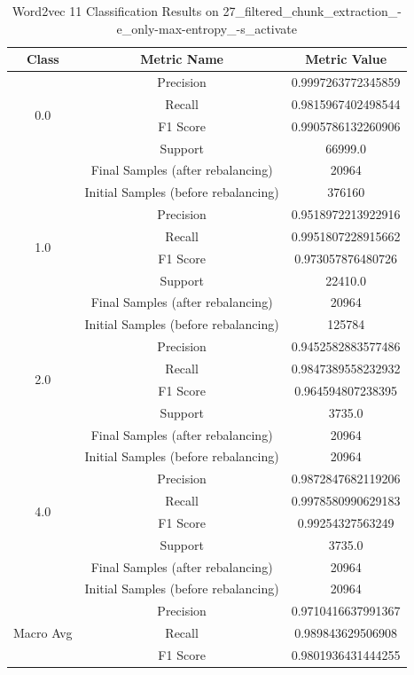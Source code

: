 \begin{longtable}{|c|c|c|}
\caption{Word2vec 11 Classification Results on 27\_filtered\_chunk\_extraction\_-e\_only-max-entropy\_-s\_activate} \label{tab:27_filtered_chunk_extraction_-e_only-max-entropy_-s_activate_word2vec_11_classifiers_results} \\
\hline
Class & Metric Name & Metric Value \\
\hline
\multirow{4}{*}{0.0} & Precision & 0.9997263772345859 \\
 & Recall & 0.9815967402498544 \\
 & F1 Score & 0.9905786132260906 \\
 & Support & 66999.0 \\
 & Final Samples (after rebalancing) & 20964 \\
 & Initial Samples (before rebalancing) & 376160 \\
\hline
\multirow{4}{*}{1.0} & Precision & 0.9518972213922916 \\
 & Recall & 0.9951807228915662 \\
 & F1 Score & 0.973057876480726 \\
 & Support & 22410.0 \\
 & Final Samples (after rebalancing) & 20964 \\
 & Initial Samples (before rebalancing) & 125784 \\
\hline
\multirow{4}{*}{2.0} & Precision & 0.9452582883577486 \\
 & Recall & 0.9847389558232932 \\
 & F1 Score & 0.964594807238395 \\
 & Support & 3735.0 \\
 & Final Samples (after rebalancing) & 20964 \\
 & Initial Samples (before rebalancing) & 20964 \\
\hline
\multirow{4}{*}{4.0} & Precision & 0.9872847682119206 \\
 & Recall & 0.9978580990629183 \\
 & F1 Score & 0.99254327563249 \\
 & Support & 3735.0 \\
 & Final Samples (after rebalancing) & 20964 \\
 & Initial Samples (before rebalancing) & 20964 \\
\hline
\multirow{4}{*}{Macro Avg} & Precision & 0.9710416637991367 \\
 & Recall & 0.989843629506908 \\
 & F1 Score & 0.9801936431444255 \\

\end{longtable}
